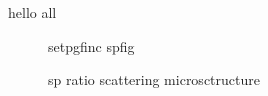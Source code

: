 hello all
\begin{figure}[ht]
 \centering
 {setpgfinc}
 {spfig}
 \caption{sp ratio scattering microsctructure}
 \label{fig:spratio}
\end{figure}
